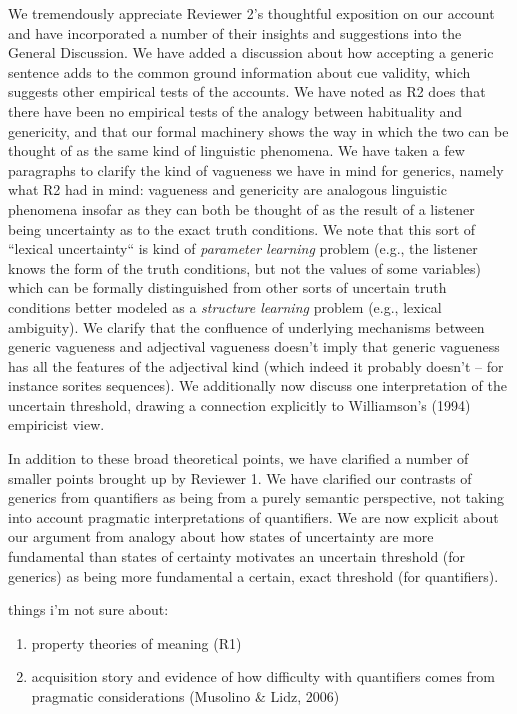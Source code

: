 \documentclass[11pt,letterpaper]{letter} %
\newcommand{\ndg}[1]{{\color{green}{[ndg: #1]}}}
\begin{document}
\begin{letter}
We tremendously appreciate Reviewer 2's thoughtful exposition on our account and have incorporated a number of their insights and suggestions into the General Discussion.
We have added a discussion about how accepting a generic sentence adds to the common ground information about cue validity, which suggests other empirical tests of the accounts.
We have noted as R2 does that there have been no empirical tests of the analogy between habituality and genericity, and that our formal machinery shows the way in which the two can be thought of as the same kind of linguistic phenomena.
We have taken a few paragraphs to clarify the kind of vagueness we have in mind for generics, namely what R2 had in mind: vagueness and genericity are analogous linguistic phenomena insofar as they can both be thought of as the result of a listener being uncertainty as to the exact truth conditions. 
We note that this sort of ``lexical uncertainty`` is kind of \emph{parameter learning} problem (e.g., the listener knows the form of the truth conditions, but not the values of some variables) which can be formally distinguished from other sorts of uncertain truth conditions better modeled as a \emph{structure learning} problem (e.g., lexical ambiguity). 
We clarify that the confluence of underlying mechanisms between generic vagueness and adjectival vagueness doesn't imply that generic vagueness has all the features of the adjectival kind (which indeed it probably doesn't -- for instance sorites sequences).
We additionally now discuss one interpretation of the uncertain threshold, drawing a connection explicitly to Williamson's (1994) empiricist view.

In addition to these broad theoretical points, we have clarified a number of smaller points brought up by Reviewer 1.
We have clarified our contrasts of generics from quantifiers as being from a purely semantic perspective, not taking into account pragmatic interpretations of quantifiers. 
We are now explicit about our argument from analogy about how states of uncertainty are more fundamental than states of certainty motivates an uncertain threshold (for generics) as being more fundamental a certain, exact threshold (for quantifiers). \ndg{that last sentence confuses me. also see comment below about learning stuff. maybe tone this all down?}


things i'm not sure about:
\begin{enumerate}
\item property theories of meaning (R1) \ndg{they are alluding to theories of concepts -- conceptual role, feature-based, etc. i think we can add a few comments to the section on relation to conceptual theories of generics about this. basically we are not committed to any particular theory of concepts, as long as they are able to yield quantitative feature probabilities.}
\item acquisition story and evidence of how difficulty with quantifiers comes from pragmatic considerations (Musolino \& Lidz, 2006) \ndg{we could remove this speculation, or town it down. we don't really want dig deeply into work on quantifier acquisition here....}
\end{enumerate}


\end{letter}
\end{document}
